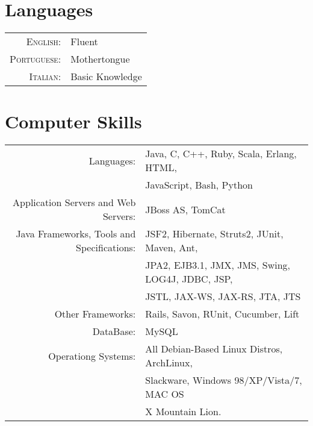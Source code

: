 \documentclass[a4paper,10pt]{article} %
\begin{document}

\section{Languages}

\begin{tabular}{rl}
\textsc{English:} & Fluent\\

\textsc{Portuguese:} & Mothertongue\\

\textsc{Italian:} & Basic Knowledge\\
\end{tabular}


\section{Computer Skills}

\begin{tabular}{r|p{11cm}}
Languages: & Java, C, C++, Ruby, Scala, Erlang, HTML,\\& JavaScript, Bash, Python
\multicolumn{2}{c}{}\\

Application Servers and Web Servers: & JBoss AS, TomCat
\multicolumn{2}{c}{}\\

Java Frameworks, Tools and Specifications: & JSF2, Hibernate, Struts2, JUnit, Maven, Ant,\\& JPA2, EJB3.1, JMX, JMS, Swing, LOG4J, JDBC, JSP,\\& JSTL, JAX-WS, JAX-RS, JTA, JTS
\multicolumn{2}{c}{}\\

Other Frameworks: & Rails, Savon, RUnit, Cucumber, Lift
\multicolumn{2}{c}{}\\

DataBase: & MySQL
\multicolumn{2}{c}{}\\

Operationg Systems: & All Debian-Based Linux Distros, ArchLinux,\\& Slackware, Windows 98/XP/Vista/7, MAC OS\\& X Mountain Lion.


\end{tabular}
\end{document}
